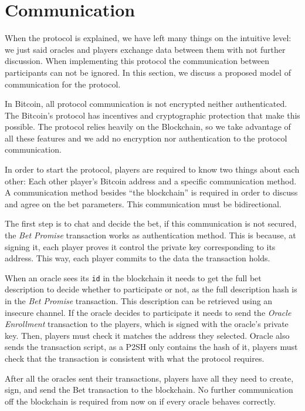 \section{Communication}

When the protocol is explained, we have left many things on the intuitive level:
  we just said oracles and players exchange data between them with not further
  discussion.
When implementing this protocol the communication between participants can
  not be ignored.
In this section, we discuss a proposed model of communication for the protocol.

In Bitcoin, all protocol communication is not encrypted neither authenticated.
The Bitcoin's protocol has incentives and cryptographic protection that make
  this possible.
The protocol relies heavily on the Blockchain, so we take advantage of all these
  features and we add no encryption nor authentication to the protocol
  communication.

In order to start the protocol, players are required to know two things about
  each other: Each other player's Bitcoin address and a specific communication
  method.
A communication method besides ``the blockchain'' is required in order to
  discuss and agree on the bet parameters.
This communication must be bidirectional.

The first step is to chat and decide the bet, if this communication is not
  secured, the \textit{Bet Promise} transaction works as authentication method.
This is because, at signing it, each player proves it control the private key
  corresponding to its address.
This way, each player commits to the data the transaction holds.

When an oracle sees its \texttt{id} in the blockchain it needs to get the full
  bet description to decide whether to participate or not, as the full
  description hash is in the \textit{Bet Promise} transaction.
This description can be retrieved using an insecure channel.
If the oracle decides to participate it needs to send the \textit{Oracle
  Enrollment} transaction to the players, which is signed with the oracle's
  private key.
Then, players must check it matches the address they selected.
Oracle also sends the transaction script, as a P2SH only contains the hash of
  it, players must check that the transaction is consistent with what the
  protocol requires.

After all the oracles sent their transactions, players have all they need
  to create, sign, and send the Bet transaction to the blockchain.
No further communication off the blockchain is required from now on if every
  oracle behaves correctly.

